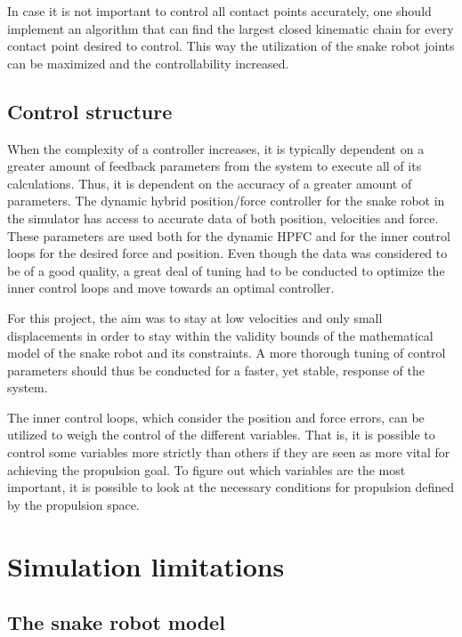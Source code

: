 In case it is not important to control all contact points accurately, one should implement an algorithm that can find the largest closed kinematic chain for every contact point desired to control. This way the utilization of the snake robot joints can be maximized and the controllability increased.

\subsection{Control structure}

When the complexity of a controller increases, it is typically dependent on a greater amount of feedback parameters from the system to execute all of its calculations. Thus, it is dependent on the accuracy of a greater amount of parameters. The dynamic hybrid position/force controller for the snake robot in the simulator has access to accurate data of both position, velocities and force. These parameters are used both for the dynamic HPFC and for the inner control loops for the desired force and position. Even though the data was considered to be of a good quality, a great deal of tuning had to be conducted to optimize the inner control loops and move towards an optimal controller. 

For this project, the aim was to stay at low velocities and only small displacements in order to stay within the validity bounds of the mathematical model of the snake robot and its constraints. A more thorough tuning of control parameters should thus be conducted for a faster, yet stable, response of the system.

The inner control loops, which consider the position and force errors, can be utilized to weigh the control of the different variables. That is, it is possible to control some variables more strictly than others if they are seen as more vital for achieving the propulsion goal. To figure out which variables are the most important, it is possible to look at the necessary conditions for propulsion defined by the propulsion space.



\section{Simulation limitations}

\subsection{The snake robot model}

